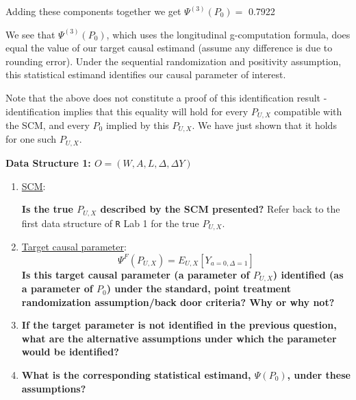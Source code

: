 \documentclass[answers]{exam}
\newenvironment{packed_item}{
\begin{itemize}
 \setlength{\itemsep}{0pt}
  \setlength{\parskip}{0pt}
  \setlength{\parsep}{0pt}
}{\end{itemize}}
\begin{document}
\begin{solution}
\begin{enumerate}
\begin{enumerate}
Adding these components together we get $\Psi^{(3)}(P_0) = $ 0.7922 
\end{enumerate}

We see that $\Psi^{(3)}(P_0)$, which uses the longitudinal g-computation formula, does equal the value of our target causal estimand (assume any difference is due to rounding error). Under the sequential randomization and positivity assumption, this statistical estimand identifies our causal parameter of interest.

Note that the above does not constitute a proof of this identification result - identification implies that this equality will hold for every $P_{U,X}$ compatible with the SCM, and every $P_0$ implied by this $P_{U,X}$. We have just shown that it holds for one such $P_{U,X}$.

\end{enumerate}
\end{solution}

\pagebreak
\noindent\large\textbf{Data Structure 1: $O = (W, A, L, \Delta, \Delta Y)$}
\normalsize

\begin{enumerate}
\item \underline{SCM}:
\textbf{Is the true $P_{U,X}$ described by the SCM presented?} Refer back to the first data structure of \texttt{R} Lab 1 for the true $P_{U,X}$.
\item \underline{Target causal parameter}:
\[
\Psi^F(P_{U,X}) = E_{U,X}[Y_{a=0, \Delta=1}]
\]
\textbf{Is this target causal parameter (a parameter of $P_{U,X}$) identified (as a parameter of $P_0$) under the standard, point treatment randomization assumption/back door criteria? Why or why not?}
\item \textbf{If the target parameter is not identified in the previous question, what are the alternative assumptions under which the parameter would be identified?} 
\item \textbf{What is the corresponding statistical estimand, $\Psi(P_0)$, under these assumptions?}
\end{enumerate}
\end{document}
